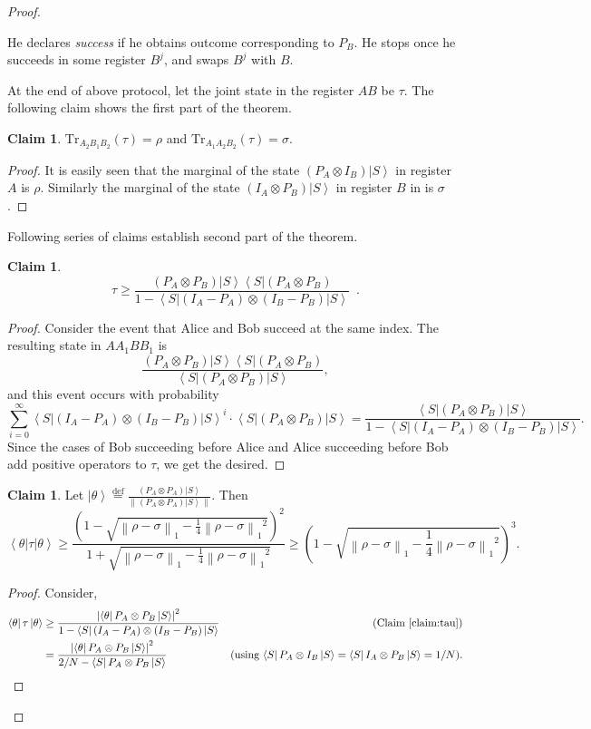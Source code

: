 \documentclass[11pt,a4paper]{article}
\theoremstyle{plain}
\theoremstyle{definition}
\newtheorem{claim}[theorem]{Claim}
\newcommand {\defeq} {\ensuremath{ \stackrel{\mathrm{def}}{=} }}
\newcommand {\abs} [1] {\ensuremath{ \left| #1 \right| }}
\newcommand {\norm} [1] {\ensuremath{ \left\| #1 \right\| }}
\newcommand {\normsub} [2] {\ensuremath{ \norm{#1}_{#2} }}
\newcommand {\onenorm} [1] {\normsub{#1}{1}}
\newcommand {\bra} [1] {\ensuremath{ \left\langle #1 \right| }}
\newcommand {\ket} [1] {\ensuremath{ \left| #1 \right\rangle }}
\newcommand {\Tr} {\ensuremath{ \mathrm{Tr} }}
\begin{document}
\begin{proof}
\begin{mdframed}
\begin{enumerate}
He declares \textit{success} if he obtains outcome corresponding to $P_B$. He stops once he succeeds in some register $B^j$, and swaps $B^j$ with $B$.

\end{enumerate}

\end{mdframed}
\bigskip

At the end of above protocol, let the joint state in the register $AB$ be $\tau$. The following claim shows the first part of the theorem. 
\begin{claim}\label{redstate}
$\Tr_{A_2B_1B_2}(\tau)=\rho$ and $\Tr_{A_1A_2B_2}(\tau)=\sigma$.
\end{claim}
\begin{proof}
It is easily seen that the marginal of the state $(P_A \otimes I_B) \ket{S}$ in register $A$  is $\rho$. Similarly the marginal of the state $(I_A \otimes P_B) \ket{S}$ in register $B$ in  is $\sigma$.
\end{proof}

Following series of claims establish second part of the theorem.
\begin{claim} \label{claim:tau}
\begin{equation*}
\tau \geq \frac{(P_A\otimes P_B)\ket{S}\bra{S}(P_A\otimes P_B) }{1 - \bra{S} (I_A-P_A)\otimes(I_B-P_B)\ket{S}} \enspace .
\end{equation*}
\end{claim}
\begin{proof}
Consider the event that Alice and Bob succeed at the same index. The resulting state in $AA_1BB_1$ is 
$$\frac{(P_A\otimes P_B ) \ket{S}\bra{S} (P_A\otimes P_B)}{\bra{S}(P_A \otimes P_B)\ket{S}},$$ 
and this event occurs with probability 
$$\sum_{i=0}^{\infty}\bra{S}(I_A-P_A)\otimes(I_B-P_B)\ket{S}^{i} \cdot \bra{S}(P_A \otimes P_B)\ket{S}= \frac{\bra{S}(P_A \otimes P_B)\ket{S}}{1 - \bra{S}(I_A-P_A)\otimes(I_B-P_B)\ket{S}}.$$ 
Since the cases of Bob succeeding before Alice and Alice succeeding before Bob add positive operators to $\tau$, we get the desired.  
\end{proof}

\begin{claim}\label{overlaptau}
Let $\ket{\theta} \defeq \frac{(P_A\otimes P_A)\ket{S}}{\norm{(P_A\otimes P_A)\ket{S}}}$. Then 
$$\bra{\theta}\tau\ket{\theta} \geq \frac{\left(1-\sqrt{\onenorm{\rho-\sigma} - \frac{1}{4}\onenorm{\rho-\sigma}^2}\right)^2}{1 + \sqrt{\onenorm{\rho-\sigma} - \frac{1}{4}\onenorm{\rho-\sigma}^2}} \geq \left(1-\sqrt{\onenorm{\rho-\sigma} - \frac{1}{4}\onenorm{\rho-\sigma}^2}\right)^3 .$$ 
\end{claim}
\begin{proof}
Consider,
\begin{align*}
\bra{\theta}\tau\ket{\theta} &\geq   \frac{ \abs{\bra{\theta}P_A\otimes P_B\ket{S}}^2}{1 - \bra{S} (I_A-P_A)\otimes(I_B-P_B)\ket{S}} &  \mbox{(Claim~\ref{claim:tau})}\\ 
& = \frac{ \abs{\bra{\theta}P_A\otimes P_B\ket{S}}^2}{2/N-\bra{S}P_A\otimes P_B\ket{S}} & \mbox{(using $\bra{S}P_A\otimes I_B\ket{S}=\bra{S}I_A\otimes P_B\ket{S}=1/N$)}.
\end{align*}


\end{proof}
\end{proof}
\end{document}
